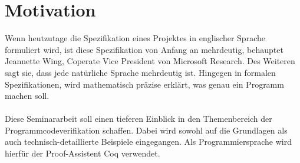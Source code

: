 \section{Motivation}
{Wenn heutzutage die Spezifikation eines Projektes in englischer Sprache formuliert wird, ist diese Spezifikation von Anfang an mehrdeutig, behauptet Jeannette Wing, Coperate Vice President von Microsoft Research. Des Weiteren sagt sie, dass jede natürliche Sprache mehrdeutig ist. Hingegen in formalen Spezifikationen, wird mathematisch präzise erklärt, was genau ein Programm machen soll.}\cite{WING01:FV}
\\
\\
Diese Seminararbeit soll einen tieferen Einblick in den Themenbereich der Programmcodeverifikation schaffen. Dabei wird sowohl auf die Grundlagen als auch technisch-detaillierte Beispiele eingegangen. Als Programmiersprache wird hierfür der Proof-Assistent Coq verwendet.


